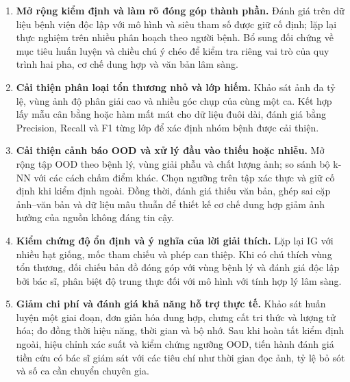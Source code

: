 \begin{enumerate}
    \item \textbf{Mở rộng kiểm định và làm rõ đóng góp thành phần.} Đánh giá trên dữ liệu bệnh viện độc lập với mô hình và siêu tham số được giữ cố định; lặp lại thực nghiệm trên nhiều phân hoạch theo người bệnh. Bổ sung đối chứng về mục tiêu huấn luyện và chiều chú ý chéo để kiểm tra riêng vai trò của quy trình hai pha, cơ chế dung hợp và văn bản lâm sàng.

    \item \textbf{Cải thiện phân loại tổn thương nhỏ và lớp hiếm.} Khảo sát ảnh đa tỷ lệ, vùng ảnh độ phân giải cao và nhiều góc chụp của cùng một ca. Kết hợp lấy mẫu cân bằng hoặc hàm mất mát cho dữ liệu đuôi dài, đánh giá bằng Precision, Recall và F1 từng lớp để xác định nhóm bệnh được cải thiện.

    \item \textbf{Cải thiện cảnh báo OOD và xử lý đầu vào thiếu hoặc nhiễu.} Mở rộng tập OOD theo bệnh lý, vùng giải phẫu và chất lượng ảnh; so sánh bộ k-NN với các cách chấm điểm khác. Chọn ngưỡng trên tập xác thực và giữ cố định khi kiểm định ngoài. Đồng thời, đánh giá thiếu văn bản, ghép sai cặp ảnh--văn bản và dữ liệu mâu thuẫn để thiết kế cơ chế dung hợp giảm ảnh hưởng của nguồn không đáng tin cậy.

    \item \textbf{Kiểm chứng độ ổn định và ý nghĩa của lời giải thích.} Lặp lại IG với nhiều hạt giống, mốc tham chiếu và phép can thiệp. Khi có chú thích vùng tổn thương, đối chiếu bản đồ đóng góp với vùng bệnh lý và đánh giá độc lập bởi bác sĩ, phân biệt độ trung thực đối với mô hình với tính hợp lý lâm sàng.

    \item \textbf{Giảm chi phí và đánh giá khả năng hỗ trợ thực tế.} Khảo sát huấn luyện một giai đoạn, đơn giản hóa dung hợp, chưng cất tri thức và lượng tử hóa; đo đồng thời hiệu năng, thời gian và bộ nhớ. Sau khi hoàn tất kiểm định ngoài, hiệu chỉnh xác suất và kiểm chứng ngưỡng OOD, tiến hành đánh giá tiền cứu có bác sĩ giám sát với các tiêu chí như thời gian đọc ảnh, tỷ lệ bỏ sót và số ca cần chuyển chuyên gia.
\end{enumerate}
